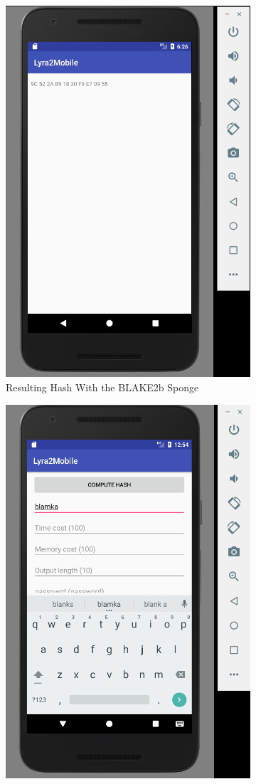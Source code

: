 \begin{figure}[H]
\begin{subfigure}{.5\textwidth}
  \includegraphics[width=.8\linewidth]{figures/lyra2-mobile-result-clean}
  \caption{Resulting Hash With the BLAKE2b Sponge}
  \label{fig:lyra2-mobile-result-blake2b}
\end{subfigure}
\begin{subfigure}{.5\textwidth}
  \centering
  \includegraphics[width=.8\linewidth]{figures/lyra2-mobile-main-blamka-clean}

\end{subfigure}
\end{figure}
